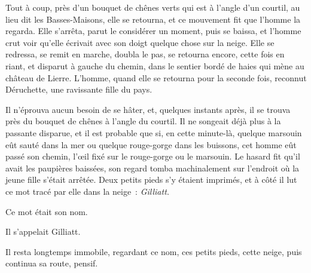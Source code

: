 \documentclass[french,twoside]{book} %
\begin{document}
Tout à coup, près d’un bouquet de chênes verts qui est à l’angle d’un courtil, au lieu dit les Basses-Maisons, elle se retourna, et ce mouvement fit que l’homme la regarda. Elle s’arrêta, parut le considérer un moment,  puis se baissa, et l’homme crut voir qu’elle écrivait avec son doigt quelque chose sur la neige. Elle se redressa, se remit en marche, doubla le pas, se retourna encore, cette fois en riant, et disparut à gauche du chemin, dans le sentier bordé de haies qui mène au château de Lierre. L’homme, quand elle se retourna pour la seconde fois, reconnut Déruchette, une ravissante fille du pays.\par
Il n’éprouva aucun besoin de se hâter, et, quelques instants après, il se trouva près du bouquet de chênes à l’angle du courtil. Il ne songeait déjà plus à la passante disparue, et il est probable que si, en cette minute-là, quelque marsouin eût sauté dans la mer ou quelque rouge-gorge dans les buissons, cet homme eût passé son chemin, l’œil fixé sur le rouge-gorge ou le marsouin. Le hasard fit qu’il avait les paupières baissées, son regard tomba machinalement sur l’endroit où la jeune fille s’était arrêtée. Deux petits pieds s’y étaient imprimés, et à côté il lut ce mot tracé par elle dans la neige : \emph{Gilliatt.}\par
Ce mot était son nom.\par
Il s’appelait Gilliatt.\par
Il resta longtemps immobile, regardant ce nom, ces petits pieds, cette neige, puis continua sa route, pensif.
\end{document}
